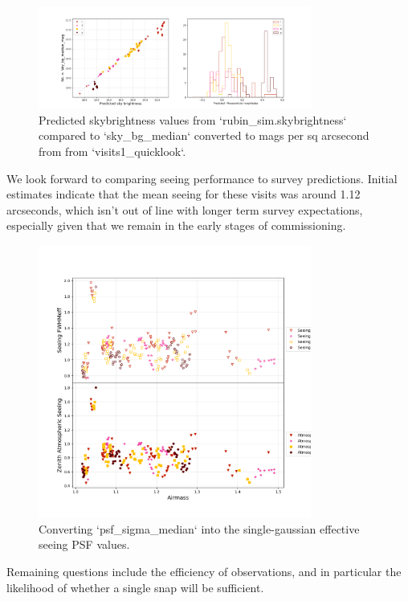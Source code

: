 \begin{figure}
    \centering
    \includegraphics[width=0.8\textwidth]{sp/sky.png}
    \caption{Predicted skybrightness values from `rubin\_sim.skybrightness`  compared to `sky\_bg\_median` converted to mags per sq arcsecond  from  from `visits1\_quicklook`.}
    \label{fig:sky}
    \end{figure}
    
  
We look forward to comparing seeing performance to survey predictions. Initial estimates indicate that the mean seeing for these visits was around 1.12 arcseconds, which isn't out of line with longer term survey expectations, especially given that we remain in the early stages of commissioning. 

\begin{figure}
    \centering
    \includegraphics[width=0.8\textwidth]{sp/seeing.png}
    \caption{Converting `psf_sigma_median` into the single-gaussian effective seeing PSF values.}
    \label{fig:seeing}
    \end{figure}
    
   
Remaining questions include the efficiency of observations, and in particular the likelihood of whether a single snap will be sufficient. 